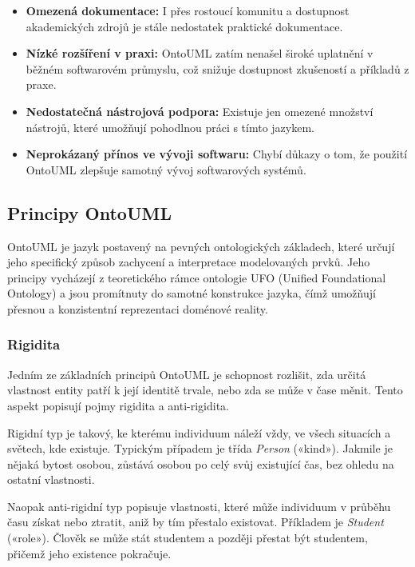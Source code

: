 \begin{itemize}
  \item \textbf{Omezená dokumentace:} I přes rostoucí komunitu a dostupnost akademických zdrojů je stále nedostatek praktické dokumentace.
  \item \textbf{Nízké rozšíření v praxi:} OntoUML zatím nenašel široké uplatnění v běžném softwarovém průmyslu, což snižuje dostupnost zkušeností a příkladů z praxe.
  \item \textbf{Nedostatečná nástrojová podpora:} Existuje jen omezené množství nástrojů, které umožňují pohodlnou práci s tímto jazykem.
  \item \textbf{Neprokázaný přínos ve vývoji softwaru:} Chybí důkazy o tom, že použití OntoUML zlepšuje samotný vývoj softwarových systémů. \cite{CCMi_ontouml}
\end{itemize}


\subsection{Principy OntoUML}
\label{sec:principy-ontouml}
OntoUML je jazyk postavený na pevných ontologických základech, které určují jeho specifický způsob zachycení a interpretace modelovaných prvků. Jeho principy vycházejí z teoretického rámce ontologie UFO (Unified Foundational Ontology) a jsou promítnuty do samotné konstrukce jazyka, čímž umožňují přesnou a konzistentní reprezentaci doménové reality. \cite{Pergl2018}


\subsubsection{Rigidita}
\label{sec:ontouml-rigidita}
Jedním ze základních principů OntoUML je schopnost rozlišit, zda určitá vlastnost entity patří k její identitě trvale, nebo zda se může v čase měnit. Tento aspekt popisují pojmy rigidita a anti-rigidita.

Rigidní typ je takový, ke kterému individuum náleží vždy, ve všech situacích a světech, kde existuje. Typickým případem je třída \textit{Person} («kind»). Jakmile je nějaká bytost osobou, zůstává osobou po celý svůj existující čas, bez ohledu na ostatní vlastnosti. \cite{Pergl2018,KOM_prezentace2}

Naopak anti-rigidní typ popisuje vlastnosti, které může individuum v průběhu času získat nebo ztratit, aniž by tím přestalo existovat. Příkladem je \textit{Student} («role»). Člověk se může stát studentem a později přestat být studentem, přičemž jeho existence pokračuje. \cite{Pergl2018,KOM_prezentace2}

